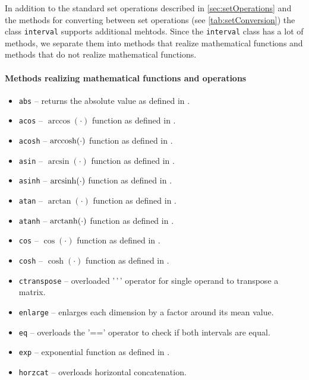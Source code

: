 In addition to the standard set operations described in \cref{sec:setOperations} and the methods for converting between set operations (see \cref{tab:setConversion}) the class \texttt{interval} supports additional mehtods. Since the \texttt{interval} class has a lot of methods, we separate them into methods that realize mathematical functions and methods that do not realize mathematical functions.

\paragraph{Methods realizing mathematical functions and operations}
\begin{itemize}
    \item \texttt{abs} -- returns the absolute value as defined in \cite[Eq.~(10)]{Althoff2016a}.
    \item \texttt{acos} -- $\arccos(\cdot)$ function as defined in \cite[Eq.~(6)]{Althoff2016a}.
    \item \texttt{acosh} -- $\operatorname{arccosh}(\cdot)$ function as defined in \cite[Eq.~(8)]{Althoff2016a}.
    \item \texttt{asin} -- $\arcsin(\cdot)$ function as defined in \cite[Eq.~(6)]{Althoff2016a}.
    \item \texttt{asinh} -- $\operatorname{arcsinh}(\cdot)$ function as defined in \cite[Eq.~(8)]{Althoff2016a}.
    \item \texttt{atan} -- $\arctan(\cdot)$ function as defined in \cite[Eq.~(6)]{Althoff2016a}.
    \item \texttt{atanh} -- $\operatorname{arctanh}(\cdot)$ function as defined in \cite[Eq.~(8)]{Althoff2016a}.
    \item \texttt{cos} -- $\cos(\cdot)$ function as defined in \cite[Eq.~(13)]{Althoff2016a}.
    \item \texttt{cosh} -- $\cosh(\cdot)$ function as defined in \cite[Eq.~(7)]{Althoff2016a}.
    \item \texttt{ctranspose} -- overloaded '\,'\,' operator for single operand to transpose a matrix.
    \item \texttt{enlarge} -- enlarges each dimension by a factor around its mean value.
    \item \texttt{eq} -- overloads the '==' operator to check if both intervals are equal.
    \item \texttt{exp} -- exponential function as defined in \cite[Eq.~(4)]{Althoff2016a}.
    \item \texttt{horzcat} -- overloads horizontal concatenation.

\end{itemize}
